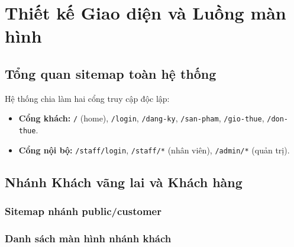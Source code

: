 \chapter{Thiết kế Giao diện và Luồng màn hình}
\label{chuong:giao_dien}

\section{Tổng quan sitemap toàn hệ thống}
\label{sec:sitemap_tong}

Hệ thống chia làm hai cổng truy cập độc lập:
\begin{itemize}
  \item \textbf{Cổng khách:} \texttt{/} (home), \texttt{/login}, \texttt{/dang-ky}, \texttt{/san-pham}, \texttt{/gio-thue}, \texttt{/don-thue}.
  \item \textbf{Cổng nội bộ:} \texttt{/staff/login}, \texttt{/staff/*} (nhân viên), \texttt{/admin/*} (quản trị).
\end{itemize}

\section{Nhánh Khách vãng lai và Khách hàng}
\label{sec:ui_khach}

\subsection{Sitemap nhánh public/customer}

\subsection{Danh sách màn hình nhánh khách}

